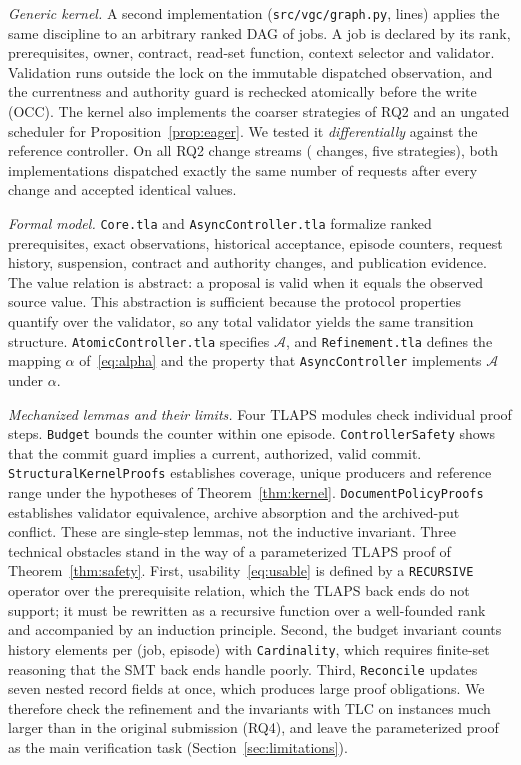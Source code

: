 \emph{Generic kernel.} A second implementation (\texttt{src/vgc/graph.py}, \GraphLines{} lines) applies the same discipline to an arbitrary ranked DAG of jobs. A job is declared by its rank, prerequisites, owner, contract, read-set function, context selector and validator. Validation runs outside the lock on the immutable dispatched observation, and the currentness and authority guard is rechecked atomically before the write (OCC). The kernel also implements the coarser strategies of RQ2 and an ungated scheduler for Proposition~\ref{prop:eager}. We tested it \emph{differentially} against the reference controller. On all \DiffRuns{} RQ2 change streams (\DiffChanges{} changes, five strategies), both implementations dispatched exactly the same number of requests after every change and accepted identical values.

\emph{Formal model.} \texttt{Core.tla} and \texttt{AsyncController.tla} formalize ranked prerequisites, exact observations, historical acceptance, episode counters, request history, suspension, contract and authority changes, and publication evidence. The value relation is abstract: a proposal is valid when it equals the observed source value. This abstraction is sufficient because the protocol properties quantify over the validator, so any total validator yields the same transition structure. \texttt{AtomicController.tla} specifies $\mathcal A$, and \texttt{Refinement.tla} defines the mapping $\alpha$ of~\eqref{eq:alpha} and the property that \texttt{AsyncController} implements $\mathcal A$ under $\alpha$.

\emph{Mechanized lemmas and their limits.} Four TLAPS modules check individual proof steps. \texttt{Budget} bounds the counter within one episode. \texttt{ControllerSafety} shows that the commit guard implies a current, authorized, valid commit. \texttt{StructuralKernelProofs} establishes coverage, unique producers and reference range under the hypotheses of Theorem~\ref{thm:kernel}. \texttt{DocumentPolicyProofs} establishes validator equivalence, archive absorption and the archived-\textsf{put} conflict. These are single-step lemmas, not the inductive invariant. Three technical obstacles stand in the way of a parameterized TLAPS proof of Theorem~\ref{thm:safety}. First, usability~\eqref{eq:usable} is defined by a \texttt{RECURSIVE} operator over the prerequisite relation, which the TLAPS back ends do not support; it must be rewritten as a recursive function over a well-founded rank and accompanied by an induction principle. Second, the budget invariant counts history elements per (job, episode) with \texttt{Cardinality}, which requires finite-set reasoning that the SMT back ends handle poorly. Third, \texttt{Reconcile} updates seven nested record fields at once, which produces large proof obligations. We therefore check the refinement and the invariants with TLC on instances much larger than in the original submission (RQ4), and leave the parameterized proof as the main verification task (Section~\ref{sec:limitations}).

